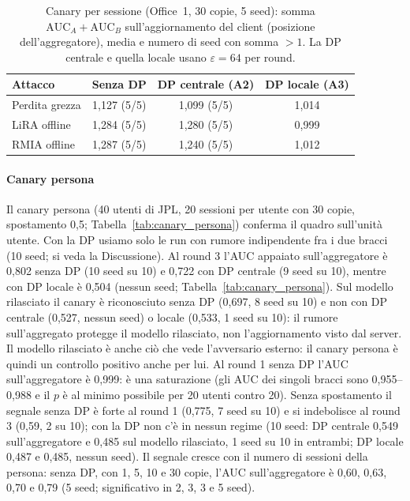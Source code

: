 \begin{table}[t]
\caption{Canary per sessione (Office~1, 30 copie, 5 seed): somma $\mathrm{AUC}_A+\mathrm{AUC}_B$
sull'aggiornamento del client (posizione dell'aggregatore), media e numero di seed con somma $>1$.
La DP centrale e quella locale usano $\varepsilon=64$ per round.}
\label{tab:canary_sessione}
\centering\footnotesize
\setlength{\tabcolsep}{4pt}
\begin{tabular}{@{}lccc@{}}
\toprule
Attacco & Senza DP & DP centrale (A2) & DP locale (A3) \\
\midrule
Perdita grezza & 1,127 (5/5) & 1,099 (5/5) & 1,014 \\
LiRA offline   & 1,284 (5/5) & 1,280 (5/5) & 0,999 \\
RMIA offline   & 1,287 (5/5) & 1,240 (5/5) & 1,012 \\
\bottomrule
\end{tabular}
\end{table}

\paragraph{Canary persona}
Il canary persona (40 utenti di JPL, 20 sessioni per utente con 30 copie, spostamento 0,5;
Tabella~\ref{tab:canary_persona}) conferma il quadro sull'unità utente. Con la DP usiamo solo le
run con rumore indipendente fra i due bracci (10 seed; si veda la Discussione). Al round 3 l'AUC
appaiato sull'aggregatore è 0,802 senza DP (10 seed su 10) e 0,722 con DP centrale (9 seed su 10),
mentre con DP locale è 0,504 (nessun seed; Tabella~\ref{tab:canary_persona}). Sul modello rilasciato il canary è riconosciuto senza
DP (0,697, 8 seed su 10) e non con DP centrale (0,527, nessun seed) o locale (0,533, 1 seed su
10): il rumore sull'aggregato protegge il modello rilasciato, non l'aggiornamento visto dal
server. Il modello rilasciato è anche ciò che vede l'avversario esterno: il canary persona è
quindi un controllo positivo anche per lui. Al round 1 senza DP l'AUC sull'aggregatore è 0,999:
è una saturazione (gli AUC dei singoli bracci sono 0,955--0,988 e il $p$ è al minimo possibile
per 20 utenti contro 20). Senza spostamento il segnale senza DP è forte al round 1 (0,775, 7
seed su 10) e si indebolisce al round 3 (0,59, 2 su 10); con la DP non c'è in nessun regime (10
seed: DP centrale 0,549 sull'aggregatore e 0,485 sul modello rilasciato, 1 seed su 10 in
entrambi; DP locale 0,487 e 0,485, nessun seed). Il segnale cresce con il numero di sessioni della
persona: senza DP, con 1, 5, 10 e 30 copie, l'AUC sull'aggregatore è 0,60, 0,63, 0,70 e 0,79
(5 seed; significativo in 2, 3, 3 e 5 seed).


